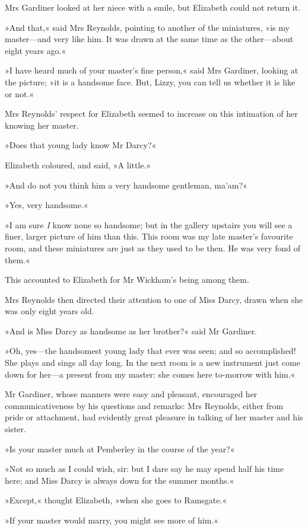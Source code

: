 Mrs Gardiner looked at her niece with a smile, but Elizabeth could not return it.

»And that,« said Mrs Reynolds, pointing to another of the miniatures, »is my master—and very like him. It was drawn at the same time as the other—about eight years ago.«

»I have heard much of your master's fine person,« said Mrs Gardiner, looking at the picture; »it is a handsome face. But, Lizzy, you can tell us whether it is like or not.«

Mrs Reynolds' respect for Elizabeth seemed to increase on this intimation of her knowing her master.

»Does that young lady know Mr Darcy?«

Elizabeth coloured, and said, »A little.«

»And do not you think him a very handsome gentleman, ma'am?«

»Yes, very handsome.«

»I am sure \textit{I} know none so handsome; but in the gallery upstairs you will see a finer, larger picture of him than this. This room was my late master's favourite room, and these miniatures are just as they used to be then. He was very fond of them.«

This accounted to Elizabeth for Mr Wickham's being among them.

Mrs Reynolds then directed their attention to one of Miss Darcy, drawn when she was only eight years old.

»And is Miss Darcy as handsome as her brother?« said Mr Gardiner.

»Oh, yes—the handsomest young lady that ever was seen; and so accomplished! She plays and sings all day long. In the next room is a new instrument just come down for her—a present from my master: she comes here to-morrow with him.«

Mr Gardiner, whose manners were easy and pleasant, encouraged her communicativeness by his questions and remarks: Mrs Reynolds, either from pride or attachment, had evidently great pleasure in talking of her master and his sister.

»Is your master much at Pemberley in the course of the year?«

»Not so much as I could wish, sir: but I dare say he may spend half his time here; and Miss Darcy is always down for the summer months.«

»Except,« thought Elizabeth, »when she goes to Ramsgate.«

»If your master would marry, you might see more of him.«


